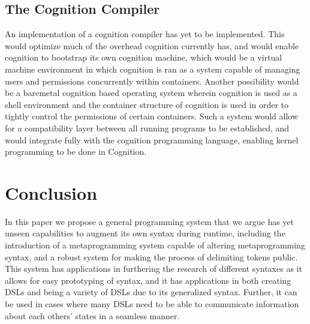 \documentclass[
	a4paper,
	10pt,
	twoside,
]{LTJournalArticle}
\begin{document}
\subsection{The Cognition Compiler}
An implementation of a cognition compiler has yet to be implemented. This would optimize much of the
overhead cognition currently has, and would enable cognition to bootstrap its own cognition machine, which would be a virtual
machine environment in which cognition is ran as a system capable of managing users and permissions concurrently within
containers. Another possibility would be a baremetal cognition based operating system wherein cognition is used as a shell
environment and the container structure of cognition is used in order to tightly control the permissions of certain containers.
Such a system would allow for a compatibility layer between all running programs to be established, and would integrate fully
with the cognition programming language, enabling kernel programming to be done in Cognition.

\section{Conclusion}
In this paper we propose a general programming system that we argue has yet unseen capabilities to augment its own syntax
during runtime, including the introduction of a metaprogramming system capable of altering metaprogramming syntax, and a
robust system for making the process of delimiting tokens public. This system has applications in furthering the research
of different syntaxes as it allows for easy prototyping of syntax, and it has applications in both creating DSLs and
being a variety of DSLs due to its generalized syntax. Further, it can be used in cases where many DSLs need to be able
to communicate information about each others' states in a seamless manner.

\printbibliography
\end{document}
